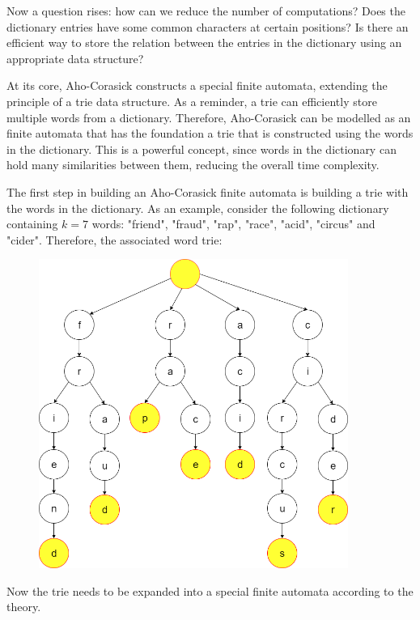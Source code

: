 \documentclass[letterpaper]{article}
\begin{document}
Now a question rises: how can we reduce the number of computations? Does the dictionary entries have some common characters at certain positions? Is there an efficient way to store the relation between the entries in the dictionary using an appropriate data structure?

At its core, Aho-Corasick constructs a special finite automata, extending the principle of a trie data structure. As a reminder, a trie can efficiently store multiple words from a dictionary. Therefore, Aho-Corasick can be modelled as an finite automata that has the foundation a trie that is constructed using the words in the dictionary. This is a powerful concept, since words in the dictionary can hold many similarities between them, reducing the overall time complexity.

The first step in building an Aho-Corasick finite automata is building a trie with the words in the dictionary. As an example, consider the following dictionary containing $k = 7$ words: "friend", "fraud", "rap", "race", "acid", "circus" and "cider". Therefore, the associated word trie:

\begin{figure} [h!]
\centering
\includegraphics[width=0.90\textwidth]{pngOfDiagrams/aho2.png}
\end{figure}

Now the trie needs to be expanded into a special finite automata according to the theory.
\end{document}
